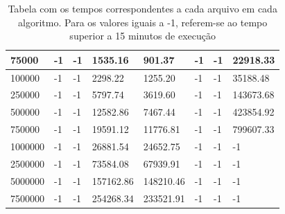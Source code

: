 \documentclass[a4paper,12pt]{scrartcl}
\begin{document}
\begin{table}[]
\begin{tabular}{|l|l|l|l|l|l|l|l|}
75000              & -1            & -1            & 1535.16   & 901.37    & -1        & -1        & 22918.33  \\ \hline
100000             & -1            & -1            & 2298.22   & 1255.20   & -1        & -1        & 35188.48  \\ \hline
250000             & -1            & -1            & 5797.74   & 3619.60   & -1        & -1        & 143673.68 \\ \hline
500000             & -1            & -1            & 12582.86  & 7467.44   & -1        & -1        & 423854.92 \\ \hline
750000             & -1            & -1            & 19591.12  & 11776.81  & -1        & -1        & 799607.33 \\ \hline
1000000            & -1            & -1            & 26881.54  & 24652.75  & -1        & -1        & -1        \\ \hline
2500000           & -1            & -1            & 73584.08  & 67939.91  & -1        & -1        & -1        \\ \hline
5000000           & -1            & -1            & 157162.86 & 148210.46 & -1        & -1        & -1        \\ \hline
7500000           & -1            & -1            & 254268.34 & 233521.91 & -1        & -1        & -1        \\ \hline
\end{tabular}
\caption{Tabela com os tempos correspondentes a cada arquivo em cada algoritmo. Para os valores iguais a -1, referem-se ao tempo superior a 15 minutos de execução}
\end{table}
\end{document}
